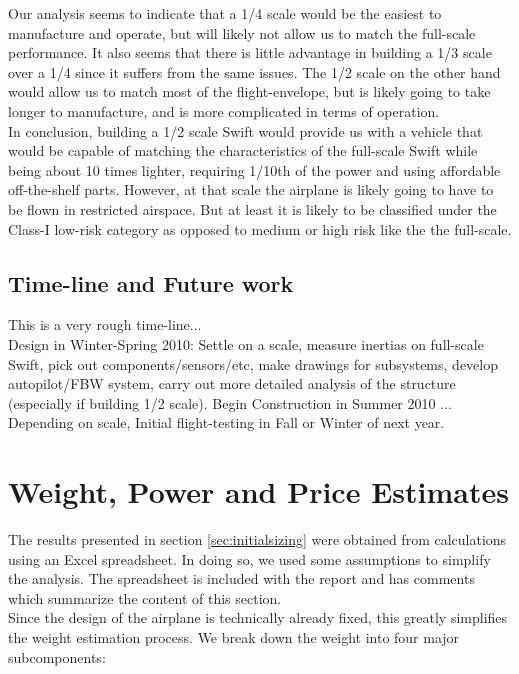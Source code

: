 \documentclass[titlepage,10pt]{article}
\begin{document}
Our analysis seems to indicate that a 1/4 scale would be the easiest to manufacture and operate, but will likely not allow us to match the full-scale performance. It also seems that there is little advantage in building a 1/3 scale over a 1/4 since it suffers from the same issues. The 1/2 scale on the other hand would allow us to match most of the flight-envelope, but is likely going to take longer to manufacture, and is more complicated in terms of operation.\\

In conclusion, building a 1/2 scale Swift would provide us with a vehicle that would be capable of matching the characteristics of the full-scale Swift while being about 10 times lighter, requiring 1/10th of the power and using affordable off-the-shelf parts. However, at that scale the airplane is likely going to have to be flown in restricted airspace. But at least it is likely to be classified under the Class-I low-risk category as opposed to medium or high risk like the the full-scale.




\subsection{Time-line and Future work}
\enlargethispage{3 \baselineskip}
This is a very rough time-line... \\
Design in Winter-Spring 2010: Settle on a scale, measure inertias on full-scale Swift, pick out components/sensors/etc, make drawings for subsystems, develop autopilot/FBW system, carry out more detailed analysis of the structure (especially if building 1/2 scale). Begin Construction in Summer 2010 ... Depending on scale, Initial flight-testing in Fall or Winter of next year.\\


\newpage
\appendix
\section{Weight, Power and Price Estimates}
\label{app:excel}
The results presented in section \ref{sec:initialsizing} were obtained from calculations using an Excel spreadsheet. In doing so, we used some assumptions to simplify the analysis. The spreadsheet is included with the report and has comments which summarize the content of this section.\\

Since the design of the airplane is technically already fixed, this greatly simplifies the weight estimation process. We break down the weight into four major subcomponents:
\end{document}
